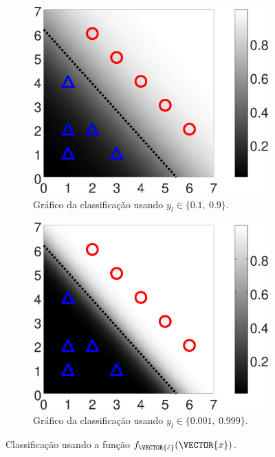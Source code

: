 \begin{figure}[!h]
    \begin{subfigure}[b]{0.45\textwidth}
        \centering
        \includegraphics[width=\textwidth]{chapters/classificacao/mfiles/reglogrnr1/ex1s1-reglogrnr1.eps}
        \caption{Gráfico da classificação usando $y_l \in \{0.1,~ 0.9\}$.}
        \label{fig:theo:reglogrnr1:xn:s1}
    \end{subfigure}
    \hfill
    \begin{subfigure}[b]{0.45\textwidth}
        \centering
        \includegraphics[width=\textwidth]{chapters/classificacao/mfiles/reglogrnr1/ex1s2-reglogrnr1.eps}
        \caption{Gráfico da classificação usando $y_l \in \{0.001,~ 0.999\}$.}
        \label{fig:theo:reglogrnr1:xn:s2}
    \end{subfigure}
    \caption{Classificação usando a função $f_{\VECTOR{\hat{c}}}(\VECTOR{x})$.}
    \label{fig:theo:reglogrnr1:xn}
\end{figure}


